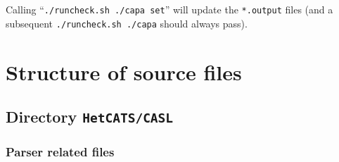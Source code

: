\documentclass{article}
\begin{document}
Calling ``\texttt{./runcheck.sh ./capa set}'' will update the \texttt{*.output} files (and a subsequent \texttt{./runcheck.sh ./capa} should always pass).

\section{Structure of source files}

\subsection{Directory \texttt{HetCATS/CASL}}

\subsubsection*{Parser related files}
\end{document}
